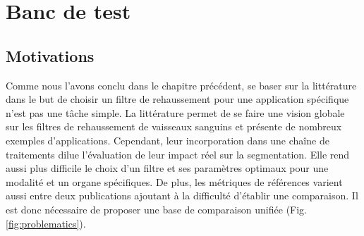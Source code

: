 %

\chapter{Banc de test}
\label{sec:Benchmark}


\section{Motivations}
\label{sec:Benchmark:Motivations}


Comme nous l'avons conclu dans le chapitre précédent, se baser sur la littérature dans le but de choisir un filtre de rehaussement pour une application spécifique n'est pas une tâche simple. La littérature permet de se faire une vision globale sur les filtres de rehaussement de vaisseaux sanguins et présente de nombreux exemples d'applications. Cependant, leur incorporation dans une chaîne de traitements dilue l'évaluation de leur impact réel sur la segmentation. Elle rend aussi plus difficile le choix d'un filtre et ses paramètres optimaux pour une modalité et un organe spécifiques. De plus, les métriques de références varient aussi entre deux publications ajoutant à la difficulté d'établir une comparaison. Il est donc nécessaire de proposer une base de
 comparaison unifiée (Fig. \ref{fig:problematics}).

